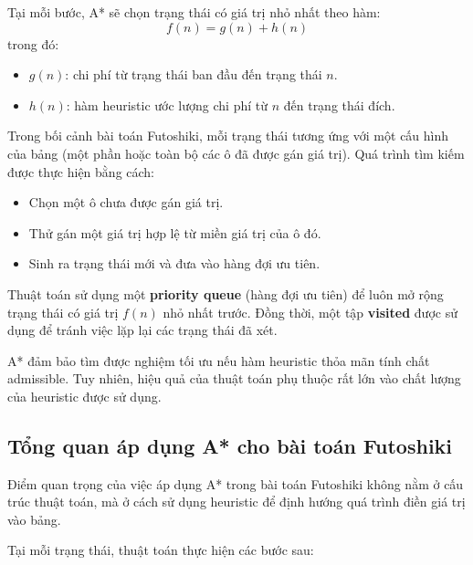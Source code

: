 Tại mỗi bước, A* sẽ chọn trạng thái có giá trị nhỏ nhất theo hàm:
\[
f(n) = g(n) + h(n)
\]
trong đó:
\begin{itemize}
    \item $g(n)$: chi phí từ trạng thái ban đầu đến trạng thái $n$.
    \item $h(n)$: hàm heuristic ước lượng chi phí từ $n$ đến trạng thái đích.
\end{itemize}

Trong bối cảnh bài toán Futoshiki, mỗi trạng thái tương ứng với một cấu hình của bảng (một phần hoặc toàn bộ các ô đã được gán giá trị). Quá trình tìm kiếm được thực hiện bằng cách:
\begin{itemize}
    \item Chọn một ô chưa được gán giá trị.
    \item Thử gán một giá trị hợp lệ từ miền giá trị của ô đó.
    \item Sinh ra trạng thái mới và đưa vào hàng đợi ưu tiên.
\end{itemize}

Thuật toán sử dụng một \textbf{priority queue} (hàng đợi ưu tiên) để luôn mở rộng trạng thái có giá trị $f(n)$ nhỏ nhất trước. Đồng thời, một tập \textbf{visited} được sử dụng để tránh việc lặp lại các trạng thái đã xét.

A* đảm bảo tìm được nghiệm tối ưu nếu hàm heuristic thỏa mãn tính chất admissible. Tuy nhiên, hiệu quả của thuật toán phụ thuộc rất lớn vào chất lượng của heuristic được sử dụng. 

\subsection{Tổng quan áp dụng A* cho bài toán Futoshiki}

Điểm quan trọng của việc áp dụng A* trong bài toán Futoshiki không nằm ở cấu trúc thuật toán, mà ở cách sử dụng heuristic để định hướng quá trình điền giá trị vào bảng.

Tại mỗi trạng thái, thuật toán thực hiện các bước sau:

